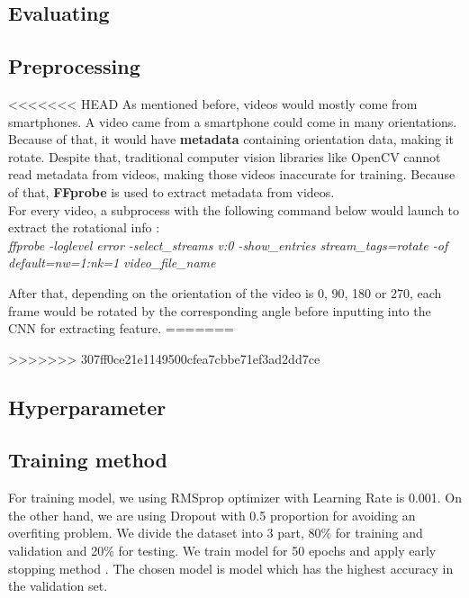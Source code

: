 \subsection{Evaluating}

\subsection{Preprocessing}
<<<<<<< HEAD
As mentioned before, videos would mostly come from smartphones. A video came from a smartphone could come in many orientations. Because of that, it would have \textbf{metadata} containing orientation data, making it rotate. Despite that, traditional computer vision libraries like OpenCV cannot read metadata from videos, making those videos inaccurate for training. Because of that, \textbf{FFprobe} is used to extract metadata from videos.\\
For every video, a subprocess with the following command below would launch to extract the rotational info :\\
\textit{ffprobe -loglevel error -select\_streams v:0 -show\_entries stream\_tags=rotate -of  default=nw=1:nk=1 video\_file\_name}

After that, depending on the orientation of the video is 0, 90, 180 or 270, each frame would be rotated by the corresponding angle before inputting into the CNN for extracting feature. 
=======

>>>>>>> 307ff0ce21e1149500cfea7cbbe71ef3ad2dd7ce
\subsection{Hyperparameter}

\subsection{Training method}
For training model, we using RMSprop optimizer \cite{} with Learning Rate is 0.001. On the other hand, we are using Dropout with 0.5 proportion for avoiding an overfiting problem. We divide the dataset into 3 part, 80\% for training and validation and 20\% for testing. We train model for 50 epochs and apply early stopping method \cite{}. The chosen model is model which has the highest accuracy in the validation set.  

